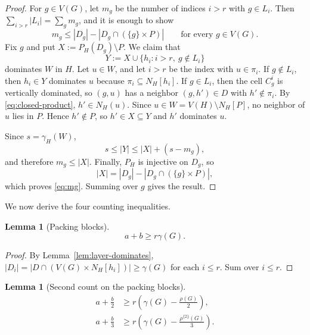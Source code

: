 \documentclass[10pt]{amsart}
\newtheorem{lemma}[theorem]{Lemma}
\theoremstyle{remark}
\newcommand{\N}{N}
\newcommand{\V}{V}
\newcommand{\PH}{P_H}
\newcommand{\rhoTwo}{\rho^{\{2\}}}
\begin{document}
\begin{proof}
For $g\in\V(G)$, let $m_g$ be the number of indices $i>r$ with $g\in L_i$.
Then $\sum_{i>r}|L_i|=\sum_gm_g$, and it is enough to show
\begin{equation}
 m_g\leq |D_g|-|D_g\cap(\{g\}\times P)|
 \qquad\text{for every }g\in\V(G).
 \label{eq:mg}
\end{equation}
Fix $g$ and put $X:=\PH(D_g)\setminus P$. We claim that
\[
 Y:=X\cup\{h_i:i>r,\ g\notin L_i\}
\]
dominates $W$ in $H$. Let $u\in W$, and let $i>r$ be the index with
$u\in\pi_i$. If $g\notin L_i$, then $h_i\in Y$ dominates $u$ because
$\pi_i\subseteq\N_H[h_i]$. If $g\in L_i$, then the cell $C_g^i$ is
vertically dominated, so $(g,u)$ has a neighbor $(g,h')\in D$ with
$h'\notin\pi_i$. By \eqref{eq:closed-product}, $h'\in\N_H(u)$. Since
$u\in W=\V(H)\setminus\N_H[P]$, no neighbor of $u$ lies in $P$. Hence
$h'\notin P$, so $h'\in X\subseteq Y$ and $h'$ dominates $u$.

Since $s=\gamma_H(W)$,
\[
 s\leq |Y|\leq |X|+(s-m_g),
\]
and therefore $m_g\leq|X|$. Finally, $\PH$ is injective on $D_g$, so
\[
 |X|=|D_g|-|D_g\cap(\{g\}\times P)|,
\]
which proves \eqref{eq:mg}. Summing over $g$ gives the result.
\end{proof}

We now derive the four counting inequalities.

\begin{lemma}[Packing blocks]\label{lem:packing-blocks}
\[
 a+b\geq r\gamma(G).
\]
\end{lemma}

\begin{proof}
By Lemma~\ref{lem:layer-dominates},
$|D_i|=|D\cap(\V(G)\times\N_H[h_i])|\geq\gamma(G)$ for each $i\leq r$.
Sum over $i\leq r$.
\end{proof}

\begin{lemma}[Second count on the packing blocks]\label{lem:second-count}
\begin{align}
 a+\frac b2&\geq r\left(\gamma(G)-\frac{\rho(G)}2\right),
 \label{eq:second-rho}\\
 a+\frac b3&\geq r\left(\gamma(G)-\frac{\rhoTwo(G)}3\right).
 \label{eq:second-rho2}
\end{align}
\end{lemma}
\end{document}
